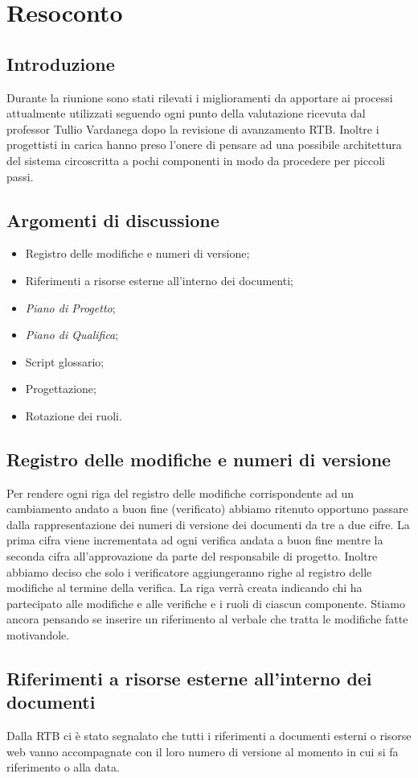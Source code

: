 \section{Resoconto}
\subsection{Introduzione}
Durante la riunione sono stati rilevati i miglioramenti da apportare ai processi attualmente 
utilizzati seguendo ogni punto della valutazione ricevuta dal professor Tullio Vardanega dopo la revisione
di avanzamento RTB.
Inoltre i progettisti in carica hanno preso l'onere di pensare ad una possibile architettura del sistema 
circoscritta a pochi componenti in modo da procedere per piccoli passi.
\subsection{Argomenti di discussione}
\begin{itemize}
    \item Registro delle modifiche e numeri di versione;
    \item Riferimenti a risorse esterne all'interno dei documenti;
    \item \textit{Piano di Progetto};
    \item \textit{Piano di Qualifica};
    \item Script glossario;
    \item Progettazione;
    \item Rotazione dei ruoli.
\end{itemize}
\subsection{Registro delle modifiche e numeri di versione}
Per rendere ogni riga del registro delle modifiche corrispondente ad un cambiamento andato a buon fine 
(verificato) abbiamo ritenuto opportuno passare dalla rappresentazione dei numeri di versione dei documenti 
da tre a due cifre.
La prima cifra viene incrementata ad ogni verifica andata a buon fine mentre la seconda cifra all'approvazione
da parte del responsabile di progetto.
Inoltre abbiamo deciso che solo i verificatore aggiungeranno righe al registro delle modifiche al termine della verifica.
La riga verrà creata indicando chi ha partecipato alle modifiche e alle verifiche e i ruoli di ciascun componente.
Stiamo ancora pensando se inserire un riferimento al verbale che tratta le modifiche fatte motivandole.
\subsection{Riferimenti a risorse esterne all'interno dei documenti}
Dalla RTB ci è stato segnalato che tutti i riferimenti a documenti esterni o risorse web vanno accompagnate con 
il loro numero di versione al momento in cui si fa riferimento o alla data.
